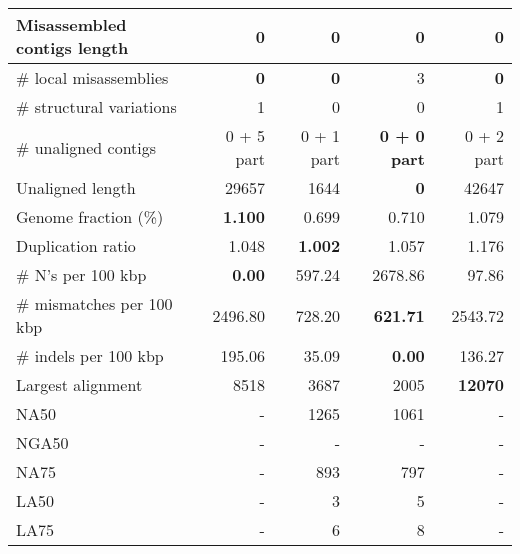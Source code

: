 \documentclass[12pt,a4paper]{article}
\begin{document}
\begin{table}[ht]
\begin{center}
\begin{tabular}{|l*{4}{|r}|}
Misassembled contigs length & 0 & 0 & 0 & 0 \\ \hline
\# local misassemblies & {\bf 0} & {\bf 0} & 3 & {\bf 0} \\ \hline
\# structural variations & 1 & 0 & 0 & 1 \\ \hline
\# unaligned contigs & 0 + 5 part & 0 + 1 part & {\bf 0 + 0 part} & 0 + 2 part \\ \hline
Unaligned length & 29657 & 1644 & {\bf 0} & 42647 \\ \hline
Genome fraction (\%) & {\bf 1.100} & 0.699 & 0.710 & 1.079 \\ \hline
Duplication ratio & 1.048 & {\bf 1.002} & 1.057 & 1.176 \\ \hline
\# N's per 100 kbp & {\bf 0.00} & 597.24 & 2678.86 & 97.86 \\ \hline
\# mismatches per 100 kbp & 2496.80 & 728.20 & {\bf 621.71} & 2543.72 \\ \hline
\# indels per 100 kbp & 195.06 & 35.09 & {\bf 0.00} & 136.27 \\ \hline
Largest alignment & 8518 & 3687 & 2005 & {\bf 12070} \\ \hline
NA50 & - & 1265 & 1061 & - \\ \hline
NGA50 & - & - & - & - \\ \hline
NA75 & - & 893 & 797 & - \\ \hline
LA50 & - & 3 & 5 & - \\ \hline
LA75 & - & 6 & 8 & - \\ \hline
\end{tabular}
\end{center}
\end{table}
\end{document}
